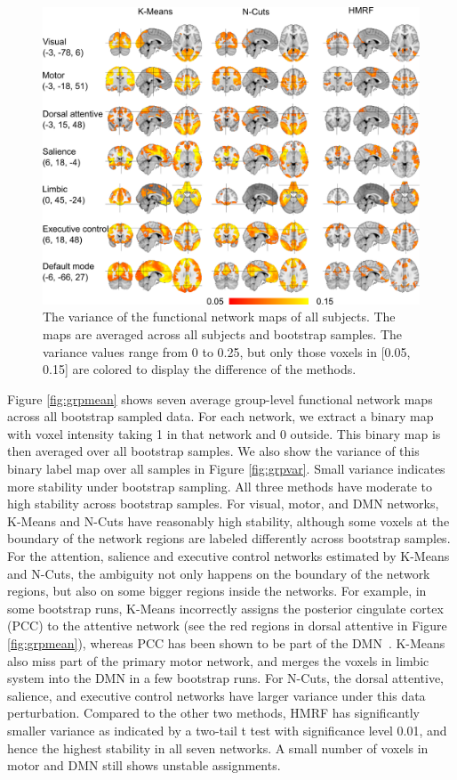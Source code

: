 \documentclass[review,authoryear]{elsarticle}
\begin{document}
\begin{figure}[htb]
  \centering
  \includegraphics[width=1.0\textwidth]{figures/varmap/sub_var}
  \caption{The variance of the functional network maps of all subjects. The maps
    are averaged across all subjects and bootstrap samples. The variance values
    range from 0 to 0.25, but only those voxels in [0.05, 0.15] are colored to
    display the difference of the methods. }
  \label{fig:subvar}
\end{figure}

Figure \ref{fig:grpmean} shows seven average group-level functional network maps
across all bootstrap sampled data. For each network, we extract a binary map
with voxel intensity taking 1 in that network and 0 outside. This binary map is
then averaged over all bootstrap samples. We also show the variance of this
binary label map over all samples in Figure \ref{fig:grpvar}. Small variance
indicates more stability under bootstrap sampling.  All three methods have
moderate to high stability across bootstrap samples. For visual, motor, and DMN
networks, K-Means and N-Cuts have reasonably high stability, although some
voxels at the boundary of the network regions are labeled differently across
bootstrap samples. For the attention, salience and executive control networks
estimated by K-Means and N-Cuts, the ambiguity not only happens on the boundary
of the network regions, but also on some bigger regions inside the networks. For
example, in some bootstrap runs, K-Means incorrectly assigns the posterior
cingulate cortex (PCC) to the attentive network (see the red regions in dorsal
attentive in Figure \ref{fig:grpmean}), whereas PCC has been shown to be part of
the DMN~\citep{greicius2003functional}. K-Means also miss part of the primary
motor network, and merges the voxels in limbic system into the DMN in a few
bootstrap runs. For N-Cuts, the dorsal attentive, salience, and executive
control networks have larger variance under this data perturbation. Compared to
the other two methods, HMRF has significantly smaller variance as indicated by a
two-tail t test with significance level 0.01, and hence the highest stability
in all seven networks. A small number of voxels in motor and DMN still shows
unstable assignments.
\end{document}
